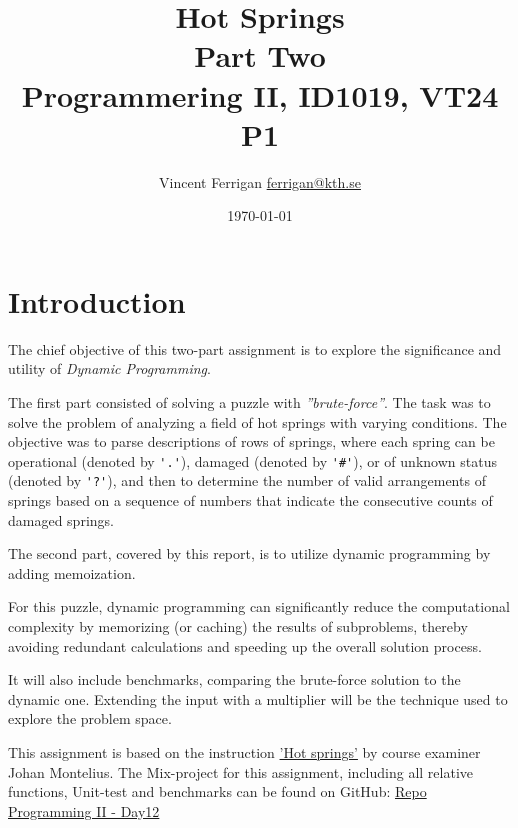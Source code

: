 \documentclass[a4paper,11pt]{article}
\begin{document}
\title{
    Hot Springs
    \\Part Two
\\\small{Programmering II, ID1019, VT24 P1}
}
\author{Vincent Ferrigan \href{mailto:ferrigan@kth.se}{ferrigan@kth.se}}

\date{\today}

\maketitle

\section*{Introduction}
\label{sec:introduction}
The chief objective of this two-part assignment is to explore the significance
and utility of \emph{Dynamic Programming}.

The first part consisted of solving a puzzle with
\emph{''brute-force''}.
The task was to solve the problem of analyzing a field of
hot springs with varying conditions.
The objective was to parse descriptions of rows of springs,
where each spring can be operational (denoted by \verb|'.'|),
damaged (denoted by \verb|'#'|), or of unknown status (denoted by \verb|'?'|),
and then to determine the number of valid arrangements of springs
based on a sequence of numbers that indicate the consecutive counts of damaged springs.

The second part, covered by this report, is to utilize dynamic programming
by adding memoization.

For this puzzle, dynamic programming can significantly reduce the computational
complexity by memorizing (or caching) the results of subproblems,
thereby avoiding redundant calculations and speeding up the overall solution process.

It will also include benchmarks, comparing the brute-force solution to the dynamic one.
Extending the input with a multiplier will be the technique used to explore the problem space.

This assignment is based on the instruction
\href{https://people.kth.se/~johanmon/courses/id1019/seminars/springs/springs.pdf}{'Hot springs'}
by course examiner Johan Montelius.
The Mix-project for this assignment, including all relative functions, Unit-test and benchmarks can be found on GitHub:
\href{https://github.com/VincentFerrigan/kth-id1019-programming-ii/tree/main/tasks/5/day12}{Repo Programming II - Day12}%
\end{document}

